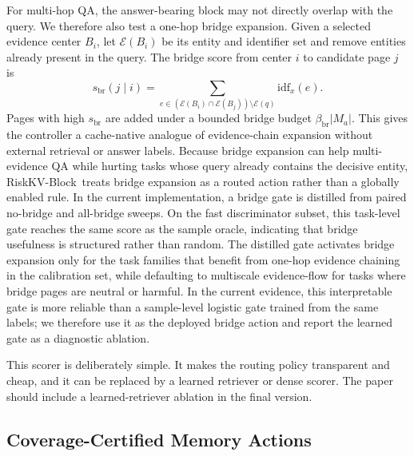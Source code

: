 \documentclass{article}
\newcommand{\method}{RiskKV-Block}
\begin{document}
For multi-hop QA, the answer-bearing block may not directly overlap with the query.
We therefore also test a one-hop bridge expansion.
Given a selected evidence center $B_i$, let $\mathcal{E}(B_i)$ be its entity and identifier set and remove entities already present in the query.
The bridge score from center $i$ to candidate page $j$ is
\begin{equation}
    s_{\mathrm{br}}(j\mid i)
    =
    \sum_{e \in (\mathcal{E}(B_i)\cap\mathcal{E}(B_j))\setminus\mathcal{E}(q)}
    \mathrm{idf}_x(e).
    \label{eq:bridge-score}
\end{equation}
Pages with high $s_{\mathrm{br}}$ are added under a bounded bridge budget $\beta_{\mathrm{br}}|M_a|$.
This gives the controller a cache-native analogue of evidence-chain expansion without external retrieval or answer labels.
Because bridge expansion can help multi-evidence QA while hurting tasks whose query already contains the decisive entity, \method\ treats bridge expansion as a routed action rather than a globally enabled rule.
In the current implementation, a bridge gate is distilled from paired no-bridge and all-bridge sweeps.
On the fast discriminator subset, this task-level gate reaches the same score as the sample oracle, indicating that bridge usefulness is structured rather than random.
The distilled gate activates bridge expansion only for the task families that benefit from one-hop evidence chaining in the calibration set, while defaulting to multiscale evidence-flow for tasks where bridge pages are neutral or harmful.
In the current evidence, this interpretable gate is more reliable than a sample-level logistic gate trained from the same labels; we therefore use it as the deployed bridge action and report the learned gate as a diagnostic ablation.

This scorer is deliberately simple.
It makes the routing policy transparent and cheap, and it can be replaced by a learned retriever or dense scorer.
The paper should include a learned-retriever ablation in the final version.

\subsection{Coverage-Certified Memory Actions}
\end{document}
